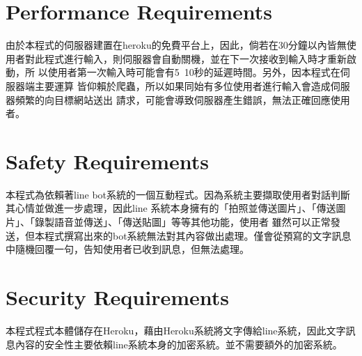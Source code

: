\documentclass{scrreprt}
\begin{document}
\section{Performance Requirements}
\begin{CJK}{UTF8}{<font>}
由於本程式的伺服器建置在heroku的免費平台上，因此，倘若在30分鐘以內皆無使
用者對此程式進行輸入，則伺服器會自動關機，並在下一次接收到輸入時才重新啟動，所
以使用者第一次輸入時可能會有5~10秒的延遲時間。另外，因本程式在伺服器端主要運算
皆仰賴於爬蟲，所以如果同始有多位使用者進行輸入會造成伺服器頻繁的向目標網站送出
請求，可能會導致伺服器產生錯誤，無法正確回應使用者。
\end{CJK}

\section{Safety Requirements}
\begin{CJK}{UTF8}{<font>}
本程式為依賴著line bot系統的一個互動程式。因為系統主要擷取使用者對話判斷其心情並做進一步處理，因此line
系統本身擁有的「拍照並傳送圖片」、「傳送圖片」、「錄製語音並傳送」、「傳送貼圖」等等其他功能，使用者
雖然可以正常發送，但本程式撰寫出來的bot系統無法對其內容做出處理。僅會從預寫的文字訊息中隨機回覆一句，告知使用者已收到訊息，但無法處理。
\end{CJK}

\section{Security Requirements}
\begin{CJK}{UTF8}{<font>}
本程式程式本體儲存在Heroku，藉由Heroku系統將文字傳給line系統，因此文字訊息內容的安全性主要依賴line系統本身的加密系統。並不需要額外的加密系統。
\end{CJK}
\end{document}

